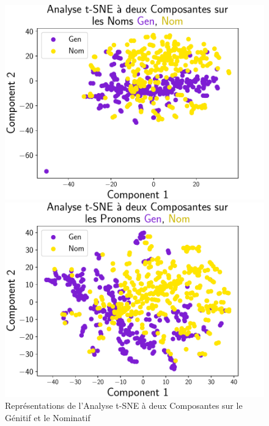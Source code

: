 \documentclass{cours}
\begin{document}
\begin{figure}[H]
\begin{minipage}{.5\textwidth}
	\begin{center}
	\includegraphics[width=\linewidth]{Figures/Visualisations/tsne_Gen_Nom_Nouns.pdf}
	\end{center}
\end{minipage}
\begin{minipage}{.5\textwidth}
	\begin{center}
	\includegraphics[width=\linewidth]{Figures/Visualisations/tsne_Gen_Nom_Pronouns.pdf}
	\end{center}
\end{minipage}
\caption{Représentations de l'Analyse t-SNE à deux Composantes sur le Génitif et le Nominatif}
\end{figure}
\end{document}
